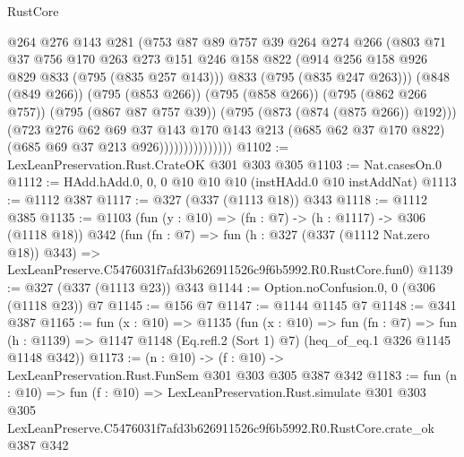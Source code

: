 \begin{lexlean}{RustCore}
\begin{coremodule}
                              @264
                              @276
                              @143
                              @281
                              (@753
                                @87
                                @89
                                @757
                                @39
                                @264
                                @274
                                @266
                                (@803
                                  @71
                                  @37
                                  @756
                                  @170
                                  @263
                                  @273
                                  @151
                                  @246
                                  @158
                                  @822
                                  (@914 @256 @158 @926 @829 @833 (@795 (@835 @257 @143)))
                                  @833
                                  (@795 (@835 @247 @263)))
                                (@848 (@849 @266))
                                (@795 (@853 @266))
                                (@795 (@858 @266))
                                (@795 (@862 @266 @757))
                                (@795 (@867 @87 @757 @39))
                                (@795 (@873 (@874 (@875 @266)) @192)))
                              (@723
                                @276
                                @62
                                @69
                                @37
                                @143
                                @170
                                @143
                                @213
                                (@685 @62 @37 @170 @822)
                                (@685 @69 @37 @213 @926)))))))))))))))
@1102 := LexLeanPreservation.Rust.CrateOK @301 @303 @305
@1103 := Nat.casesOn.{0}
@1112 := HAdd.hAdd.{0, 0, 0} @10 @10 @10 (instHAdd.{0} @10 instAddNat)
@1113 := @1112 @387
@1117 := @327 (@337 (@1113 @18)) @343
@1118 := @1112 @385
@1135 := @1103
    (fun (y : @10) => (fn : @7) -> (h : @1117) -> @306 (@1118 @18))
    @342
    (fun (fn : @7) =>
    fun (h : @327 (@337 (@1112 Nat.zero @18)) @343) =>
    LexLeanPreserve.C5476031f7afd3b626911526c9f6b5992.R0.RustCore.fun0)
@1139 := @327 (@337 (@1113 @23)) @343
@1144 := Option.noConfusion.{0, 0} (@306 (@1118 @23)) @7
@1145 := @156 @7
@1147 := @1144 @1145 @7
@1148 := @341 @387
@1165 := fun (x : @10) =>
  @1135
    (fun (x : @10) =>
    fun (fn : @7) =>
    fun (h : @1139) => @1147 @1148 (Eq.refl.{2} (Sort 1) @7) (heq_of_eq.{1} @326 @1145 @1148 @342))
@1173 := (n : @10) -> (f : @10) -> LexLeanPreservation.Rust.FunSem @301 @303 @305 @387 @342
@1183 := fun (n : @10) =>
  fun (f : @10) =>
  LexLeanPreservation.Rust.simulate
    @301
    @303
    @305
    LexLeanPreserve.C5476031f7afd3b626911526c9f6b5992.R0.RustCore.crate_ok
    @387
    @342
\end{coremodule}
\end{lexlean}
